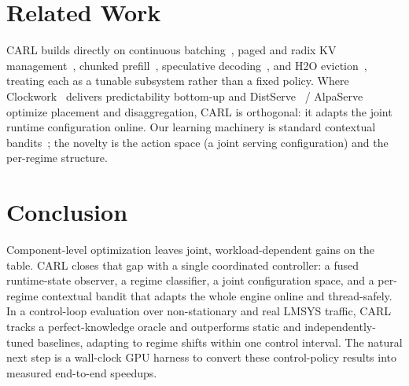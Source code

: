 \documentclass[10pt,twocolumn]{article}
\begin{document}
\section{Related Work}
\label{sec:related}

CARL builds directly on continuous batching~\cite{yu2022orca}, paged and radix KV
management~\cite{kwon2023vllm, zheng2024sglang}, chunked
prefill~\cite{agrawal2024sarathiserve}, speculative
decoding~\cite{leviathan2023speculative}, and H2O eviction~\cite{zhang2023h2o},
treating each as a tunable subsystem rather than a fixed policy. Where
Clockwork~\cite{gujarati2020clockwork} delivers predictability bottom-up and
DistServe~\cite{zhong2024distserve} / AlpaServe~\cite{li2023alpaserve} optimize
placement and disaggregation, CARL is orthogonal: it adapts the joint runtime
configuration online. Our learning machinery is standard contextual
bandits~\cite{li2010contextual, agrawal2013thompson}; the novelty is the action
space (a joint serving configuration) and the per-regime structure.

\section{Conclusion}
\label{sec:conclusion}

Component-level optimization leaves joint, workload-dependent gains on the table.
CARL closes that gap with a single coordinated controller: a fused runtime-state
observer, a regime classifier, a joint configuration space, and a per-regime
contextual bandit that adapts the whole engine online and thread-safely. In a
control-loop evaluation over non-stationary and real LMSYS traffic, CARL tracks a
perfect-knowledge oracle and outperforms static and independently-tuned
baselines, adapting to regime shifts within one control interval. The natural
next step is a wall-clock GPU harness to convert these control-policy results
into measured end-to-end speedups.



\end{document}
